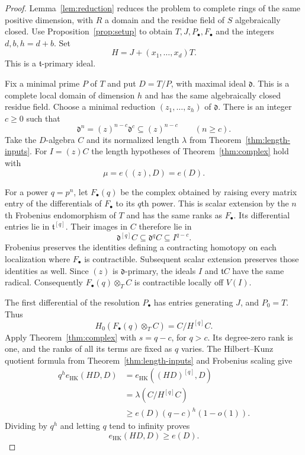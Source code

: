 \begin{proof}
Lemma~\ref{lem:reduction} reduces the problem to
complete rings of the same positive dimension, with $R$ a domain and
the residue field of $S$ algebraically closed.  Use
Proposition~\ref{prop:setup} to obtain $T,J,P_\bullet,F_\bullet$ and
the integers $d,b,h=d+b$.  Set
\[
       H=J+(x_1,\ldots,x_d)T.
\]
This is a $\mathfrak t$-primary ideal.

Fix a minimal prime $P$ of $T$ and put $D=T/P$, with maximal ideal
$\mathfrak d$.  This is a complete local domain of dimension $h$ and
has the same algebraically closed residue field.  Choose a minimal
reduction $(z_1,\ldots,z_h)$ of $\mathfrak d$.  There is an integer
$c\geq0$ such that
\[
  \mathfrak d^n=(z)^{n-c}\mathfrak d^c
      \subseteq(z)^{n-c}\qquad(n\geq c).
\]
Take the $D$-algebra $C$ and its normalized length $\lambda$ from
Theorem~\ref{thm:length-inputs}.  For $I=(z)C$ the length hypotheses
of Theorem~\ref{thm:complex} hold with
\[
       \mu=e((z),D)=e(D).
\]

For a power $q=p^n$, let $F_\bullet(q)$ be the complex obtained by
raising every matrix entry of the differentials of $F_\bullet$ to
its $q$th power.  This is scalar extension by the $n$th Frobenius
endomorphism of $T$ and has the same ranks as $F_\bullet$.  Its
differential entries lie in $\mathfrak t^{[q]}$.  Their images in
$C$ therefore lie in
\[
     \mathfrak d^{[q]}C\subseteq\mathfrak d^qC
                          \subseteq I^{q-c}.
\]
Frobenius preserves the identities defining a contracting homotopy
on each localization where $F_\bullet$ is contractible.  Subsequent
scalar extension preserves those identities as well.  Since $(z)$
is $\mathfrak d$-primary, the ideals $I$ and $\mathfrak tC$ have
the same radical.  Consequently
$F_\bullet(q)\otimes_T C$ is contractible locally off $V(I)$.

The first differential of the resolution $P_\bullet$ has entries
generating $J$, and $P_0=T$.  Thus
\[
 H_0(F_\bullet(q)\otimes_T C)=C/H^{[q]}C.
\]
Apply Theorem~\ref{thm:complex} with $s=q-c$, for $q>c$.  Its
degree-zero rank is one, and the ranks of all its terms are fixed
as $q$ varies.  The Hilbert--Kunz quotient formula from
Theorem~\ref{thm:length-inputs} and Frobenius scaling give
\begin{align*}
 q^h e_{\mathrm{HK}}(HD,D)
   &=e_{\mathrm{HK}}((HD)^{[q]},D)\\
   &=\lambda(C/H^{[q]}C)\\
   &\geq e(D)(q-c)^h(1-o(1)).
\end{align*}
Dividing by $q^h$ and letting $q$ tend to infinity proves
\[
             e_{\mathrm{HK}}(HD,D)\geq e(D).
\]


\end{proof}
